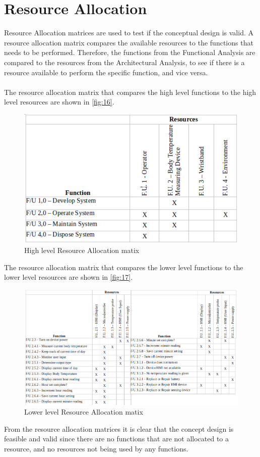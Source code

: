 \section{Resource Allocation}
Resource Allocation matrices are used to test if the conceptual design is valid. A resource allocation matrix compares the available resources to the functions that needs to be performed. Therefore, the functions from the Functional Analysis are compared to the resources from the Architectural Analysis, to see if there is a resource available to perform the specific function, and vice versa. 
\\
\\
The resource allocation matrix that compares the high level functions to the high level resources are shown in \autoref{fig:16}.
\begin{figure}[H]
	\centering
	\includegraphics[scale=0.6]{img/RA0}
	\caption{High level Resource Allocation matix}
	\label{fig:16}
\end{figure}
\noindent
The resource allocation matrix that compares the lower level functions to the lower level resources are shown in \autoref{fig:17}.
\begin{figure}[H]
	\centering
	\includegraphics[scale=0.5]{img/RA2}
	\caption{Lower level Resource Allocation matix}
	\label{fig:17}
\end{figure}
\noindent
From the resource allocation matrices it is clear that the concept design is feasible and valid since there are no functions that are not allocated to a resource, and no resources not being used by any functions.

